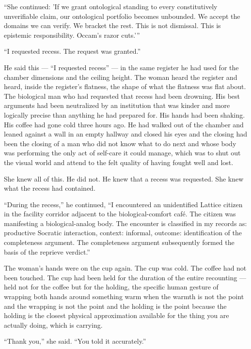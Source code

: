 \enquote{She continued: 'If we grant ontological standing to every constitutively unverifiable claim, our ontological portfolio becomes unbounded. We accept the domains we can verify. We bracket the rest. This is not dismissal. This is epistemic responsibility. Occam's razor cuts.'}

\enquote{I requested recess. The request was granted.}

He said this — \enquote{I requested recess} — in the same register he had used for the chamber dimensions and the ceiling height. The woman heard the register and heard, inside the register's flatness, the shape of what the flatness was flat about. The biological man who had requested that recess had been drowning. His best arguments had been neutralized by an institution that was kinder and more logically precise than anything he had prepared for. His hands had been shaking. His coffee had gone cold three hours ago. He had walked out of the chamber and leaned against a wall in an empty hallway and closed his eyes and the closing had been the closing of a man who did not know what to do next and whose body was performing the only act of self-care it could manage, which was to shut out the visual world and attend to the felt quality of having fought well and lost.

She knew all of this. He did not. He knew that a recess was requested. She knew what the recess had contained.

\enquote{During the recess,} he continued, \enquote{I encountered an unidentified Lattice citizen in the facility corridor adjacent to the biological-comfort café. The citizen was manifesting a biological-analog body. The encounter is classified in my records as: productive Socratic interaction, context: informal, outcome: identification of the completeness argument. The completeness argument subsequently formed the basis of the reprieve verdict.}

The woman's hands were on the cup again. The cup was cold. The coffee had not been touched. The cup had been held for the duration of the entire recounting — held not for the coffee but for the holding, the specific human gesture of wrapping both hands around something warm when the warmth is not the point and the wrapping is not the point and the holding is the point because the holding is the closest physical approximation available for the thing you are actually doing, which is carrying.

\enquote{Thank you,} she said. \enquote{You told it accurately.}

